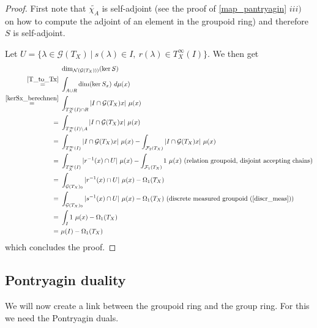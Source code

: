\documentclass[12pt,a4paper]{scrartcl}
\theoremstyle{plain}
\theoremstyle{definition}
\newcommand{\2}{\mathbb{Z} / 2 \mathbb{Z}}
\newcommand{\G}{\mathcal{G}}
\newcommand{\1}{\bar{1}}
\newcommand{\0}{\bar{0}}
\begin{document}
\begin{proof}
	First note that $\widetilde{\chi_A}$ is self-adjoint (see the proof of \ref{map_pantryagin} $iii)$ on how to compute the adjoint of an element in the groupoid ring) and therefore $S$ is self-adjoint.
	
	Let $U = \{\lambda \in \G (T_X)~|~ s(\lambda) \in I,~ r(\lambda) \in T_X^\infty(I)\}$. We then get
	\begin{align*}
		 &~ \dim_{\mathcal{N}(\G(T_X)))}(\ker S) \\
		\overset{\ref{T_to_Tx}}{=}&~ \int_{A \cup R} \dim (\ker S_x) \ d \mu (x) \\
		\overset{\ref{kerSx_berechnen}}{=}&~ \int_{T_X^\infty(I) \cap R} |I \cap \G (T_X)x| \ \mu (x) \\
		=&~ \int_{T_X^\infty(I) \setminus A} |I \cap \G (T_X)x| \ \mu (x) \\
		=&~ \int_{T_X^\infty(I)} |I \cap \G (T_X)x| \ \mu (x) - \int_{\mathcal{F}_2(T_X)} |I \cap \G (T_X)x| \ \mu (x) \\
		=&~ \int_{T_X^\infty(I)} |r^{-1}(x) \cap U| \ \mu (x)  - \int_{\mathcal{F}_1(T_X)} 1 \ \mu (x) ~ \text{(relation groupoid, disjoint accepting chains)}\\
		=&~ \int_{\G (T_X)_0} |r^{-1}(x) \cap U| \ \mu (x) - \Omega_1(T_X) \\
		=&~ \int_{\G (T_X)_0} |s^{-1}(x) \cap U| \ \mu (x) - \Omega_1(T_X) ~ \text{(discrete measured groupoid (\ref{discr_meas}))} \\
		=&~ \int_{I} 1 \ \mu (x) - \Omega_1(T_X) \\
		=&~ \mu(I) - \Omega_1(T_X)
	\end{align*}
	which concludes the proof.
\end{proof}
\subsection{Pontryagin duality}
We will now create a link between the groupoid ring and the group ring. For this we need the Pontryagin duals.
\end{document}
